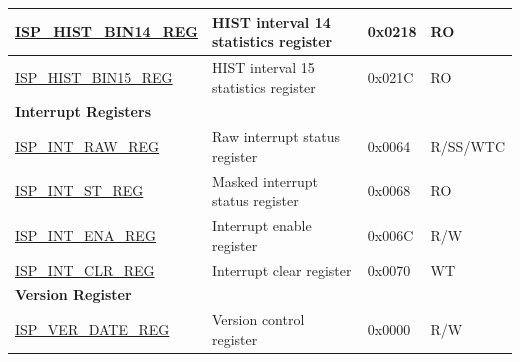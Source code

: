 \begin{longtable}{ | p{6cm} | p{7.2cm} | p{1.3cm} | p{1cm} | }
\hyperref[regdesc:ISPHISTBIN14REG]{ISP\_HIST\_BIN14\_REG} & HIST interval 14 statistics register  & 0x0218 & RO \\ \hline
\hyperref[regdesc:ISPHISTBIN15REG]{ISP\_HIST\_BIN15\_REG} & HIST interval 15 statistics register  & 0x021C & RO \\ \hline
\multicolumn{4}{|l|}{\textbf{Interrupt Registers}} \\ \hline
\hyperref[regdesc:ISPINTRAWREG]{ISP\_INT\_RAW\_REG} & Raw interrupt status register & 0x0064 & R/SS/\newline WTC \\ \hline
\hyperref[regdesc:ISPINTSTREG]{ISP\_INT\_ST\_REG} & Masked interrupt status register & 0x0068 & RO \\ \hline
\hyperref[regdesc:ISPINTENAREG]{ISP\_INT\_ENA\_REG} & Interrupt enable register & 0x006C & R/W \\ \hline
\hyperref[regdesc:ISPINTCLRREG]{ISP\_INT\_CLR\_REG} & Interrupt clear register & 0x0070 & WT \\ \hline
\multicolumn{4}{|l|}{\textbf{Version Register}} \\ \hline
\hyperref[regdesc:ISPVERDATEREG]{ISP\_VER\_DATE\_REG} & Version control register & 0x0000 & R/W \\ \hline
\end{longtable}
